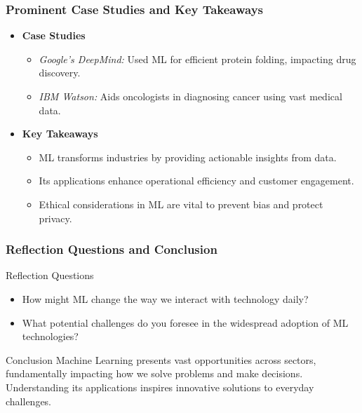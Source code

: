 \documentclass[aspectratio=169]{beamer}
\begin{document}
\begin{frame}[fragile]
    \frametitle{Prominent Case Studies and Key Takeaways}
    \begin{itemize}
        \item \textbf{Case Studies}
            \begin{itemize}
                \item \textit{Google's DeepMind:} Used ML for efficient protein folding, impacting drug discovery.
                \item \textit{IBM Watson:} Aids oncologists in diagnosing cancer using vast medical data.
            \end{itemize}
        \item \textbf{Key Takeaways}
            \begin{itemize}
                \item ML transforms industries by providing actionable insights from data.
                \item Its applications enhance operational efficiency and customer engagement.
                \item Ethical considerations in ML are vital to prevent bias and protect privacy.
            \end{itemize}
    \end{itemize}
\end{frame}

\begin{frame}[fragile]
    \frametitle{Reflection Questions and Conclusion}
    \begin{block}{Reflection Questions}
        \begin{itemize}
            \item How might ML change the way we interact with technology daily?
            \item What potential challenges do you foresee in the widespread adoption of ML technologies?
        \end{itemize}
    \end{block}
    
    \begin{block}{Conclusion}
        Machine Learning presents vast opportunities across sectors, fundamentally impacting how we solve problems and make decisions. Understanding its applications inspires innovative solutions to everyday challenges.
    \end{block}
\end{frame}
\end{document}
